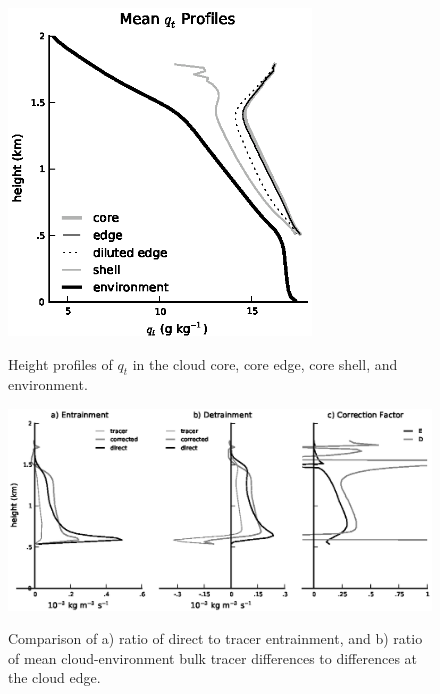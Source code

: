 \documentclass[12pt]{article}
\begin{document}
\begin{figure}[t]
  \noindent\includegraphics[width=19pc,angle=0]{./figures/shell_edge_profiles_core.eps}\\
  \caption{Height profiles of $q_t$ in the cloud core, core edge, core shell, 
and environment.}\label{fig:shell_edge_profiles}
\end{figure}

\begin{figure}[t]
  \noindent\includegraphics[width=40pc,angle=0]{./figures/corrected_entrainment_core.eps}\\
  \caption{Comparison of a) ratio of direct to tracer entrainment, and b) ratio 
of mean cloud-environment bulk tracer differences to differences at the cloud 
edge.}\label{fig:corrected_entrainment}
\end{figure}
\end{document}
